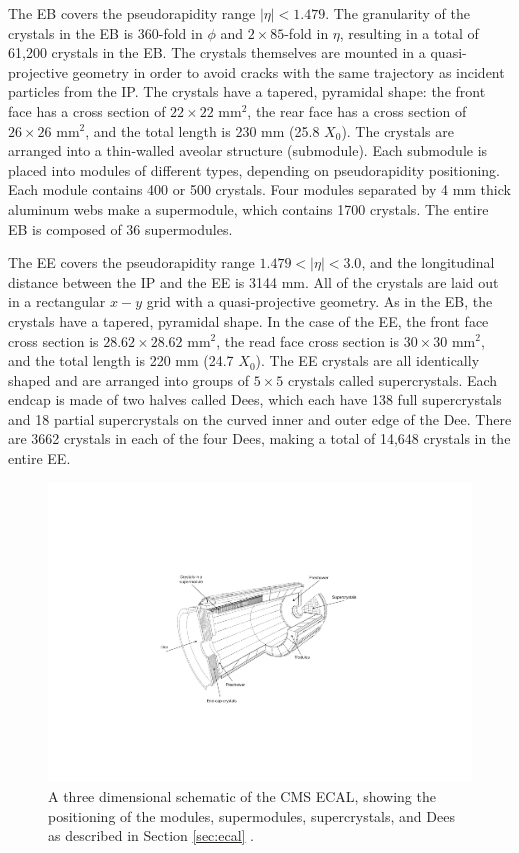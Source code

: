 The EB covers the pseudorapidity range $|\eta| < 1.479$.  The granularity
of the crystals in the EB is 360-fold in $\phi$ and $2\times85$-fold in $\eta$, 
resulting in a total of 61,200 crystals in the EB.  The crystals themselves
are mounted in a quasi-projective geometry in order to avoid cracks with the
same trajectory as incident particles from the IP.  The crystals have a tapered,
pyramidal shape: the front face has a cross section of $22\times22$ $\text{mm}^2$,
the rear face has a cross section of $26\times26$ $\text{mm}^2$, and the total
length is 230 mm (25.8 $X_0$).  The crystals are arranged into a thin-walled
aveolar structure (submodule).  Each submodule is placed into modules of
different types, depending on pseudorapidity positioning.  Each module 
contains 400 or 500 crystals.  Four modules separated by 4 mm thick aluminum 
webs make a supermodule, which contains 1700 crystals.  The entire EB is
composed of 36 supermodules.

The EE covers the pseudorapidity range $1.479 <|\eta| < 3.0$, and the longitudinal 
distance between the IP and the EE is 3144 mm.  
All of the crystals are laid out in a rectangular $x-y$ grid with 
a quasi-projective geometry.  As in the EB, the crystals have a tapered, pyramidal shape.
In the case of the EE, the front face cross section is $28.62\times28.62$ $\text{mm}^2$,
the read face cross section is $30\times30$ $\text{mm}^2$, and the total length is
220 mm (24.7 $X_0$).
The EE crystals are all identically shaped and are 
arranged into groups of $5\times5$ crystals called supercrystals.
Each endcap is made of two halves called Dees, which each have 138 full supercrystals
and 18 partial supercrystals on the curved inner and outer edge of the Dee.
There are 3662 crystals in each of the four Dees, making a total of 14,648 crystals
in the entire EE.

\begin{figure}
  \centering
  \includegraphics[width=1.0\textwidth]{tex/cms/fig/ecal-schematic.pdf}
  \caption{A three dimensional schematic of the CMS ECAL, showing the positioning 
    of the modules, supermodules, supercrystals, and Dees as described in Section 
    \ref{sec:ecal} \cite{ecal-resolution}.}
  \label{fig:ecal-3d}
\end{figure}

